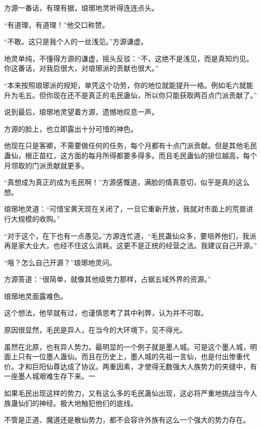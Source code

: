 
\begin{this_body}

方源一番话，有理有据，琅琊地灵听得连连点头。

“有道理，有道理！”他交口称赞。

“不敢。这只是我个人的一丝浅见。”方源谦虚。

地灵单纯，不懂得方源的谦虚，摇头反驳：“不，这绝不是浅见，而是真知灼见。你这番话，对我启很大，对琅琊派的贡献也很大。”

“本来按照琅琊派的规矩，单凭这个功劳，你的地位就能提升一格。例如毛六就能升为毛五。但你现在还不是真正的毛民蛊仙，所以你只能获取两百点门派贡献了。”

说到最后，琅琊地灵望着方源，遗憾地叹息一声。

方源的脸上，也立即露出十分可惜的神色。

他现在只是客卿，不需要做任何的任务，每个月都有十点门派贡献。但是其他毛民蛊仙，根正苗红，这方面的每月所得都要多得多。而且毛民蛊仙的排位越高，每个月领取的门派贡献就更多。

“真想成为真正的成为毛民啊！”方源感慨道，满脸的情真意切，似乎是真的这么想。

琅琊地灵道：“可惜宝黄天现在关闭了，一旦它重新开放，我就对市面上的荒兽进行大规模的收购。”

“对于这个，在下也有一点愚见。”方源连忙道，“毛民蛊仙众多，要培养他们，我派再是家大业大，也经不住这么消耗。这更不是正统的经营之法。我建议自己开源。”

“哦？怎么自己开源？”琅琊地灵问。

方源答道：“很简单，就像其他级势力那样，占据五域外界的资源。”

琅琊地灵面露难色。

这个想法，他早就有过，也谨慎思考了其中利弊，认为并不可取。

原因很显然，毛民是异人，在当今的大环境下，见不得光。

虽然在北原，也有异人势力。最明显的一个例子就是墨人城。可是这个墨人城，明面上只有一位墨人蛊仙。而且在历史上，墨人城的先祖一言仙，也是付出惨重代价。才和巨阳仙尊达成了协议。两重因素，才使得无数强大人族势力的夹缝中，有一座墨人城艰难生存下来。一

如果毛民出现这样的势力，又有这么多的毛民蛊仙出现，这必将严重地挑战当今人族蛊仙们的神经。极大地触犯他们的底线。

不管是正道、魔道还是散仙势力，都不会容许外族有这么一个强大的势力存在。


\end{this_body}

